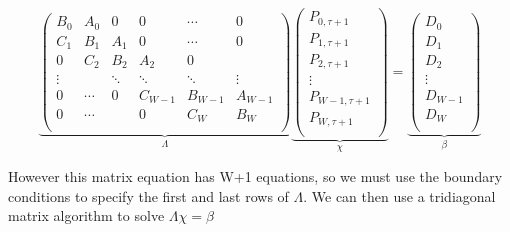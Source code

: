 \documentclass[10pt]{article}
\begin{document}
\begin{equation}
\underbrace{
\begin{pmatrix}
    B_0    & A_0   & 0      & 0      & \cdots  & 0       \\
    C_1    & B_1   & A_1    & 0      & \cdots  & 0       \\
    0      & C_2   & B_2    & A_2    & 0      &         \\
    \vdots &       & \ddots & \ddots & \ddots & \vdots  \\
    0      & \cdots & 0      & C_{W-1}& B_{W-1}& A_{W-1} \\
    0      & \cdots &        & 0      & C_W    & B_W     \\
\end{pmatrix}}_{\Lambda}
\underbrace{
\begin{pmatrix}
    P_{0,\tau+1}   \\
    P_{1,\tau+1}   \\
    P_{2,\tau+1}   \\
    \vdots         \\
    P_{W-1,\tau+1} \\
    P_{W,\tau+1}   \\
\end{pmatrix}}_{\chi}
=
\underbrace{
\begin{pmatrix}
    D_0     \\
    D_1     \\
    D_2     \\
    \vdots  \\
    D_{W-1} \\
    D_W     \\
\end{pmatrix}}_{\beta}
\end{equation}



However this matrix equation has W+1 equations, so we must use the
boundary conditions to specify the first and last rows of $\Lambda$.
We can then use a tridiagonal matrix algorithm to solve $\Lambda \chi
= \beta$
\end{document}
